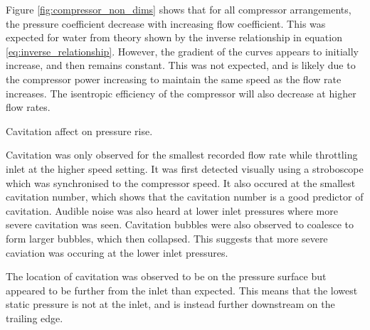 \documentclass{article}
\begin{document}
Figure \ref{fig:compressor_non_dims} shows that for all compressor arrangements, the pressure coefficient decrease with increasing flow coefficient.
This was expected for water from theory shown by the inverse relationship in equation \ref{eq:inverse_relationship}.
However, the gradient of the curves appears to initially increase, and then remains constant.
This was not expected, and is likely due to the compressor power increasing to maintain the same speed as the flow rate increases.
The isentropic efficiency of the compressor will also decrease at higher flow rates.


Cavitation affect on pressure rise.




Cavitation was only observed for the smallest recorded flow rate while throttling inlet at the higher speed setting.
It was first detected visually using a stroboscope which was synchronised to the compressor speed.
It also occured at the smallest cavitation number, which shows that the cavitation number is a good predictor of cavitation.
Audible noise was also heard at lower inlet pressures where more severe cavitation was seen.
Cavitation bubbles were also observed to coalesce to form larger bubbles, which then collapsed.
This suggests that more severe caviation was occuring at the lower inlet pressures.

The location of cavitation was observed to be on the pressure surface but appeared to be further from the inlet than expected.
This means that the lowest static pressure is not at the inlet, and is instead further downstream on the trailing edge.



\end{document}
